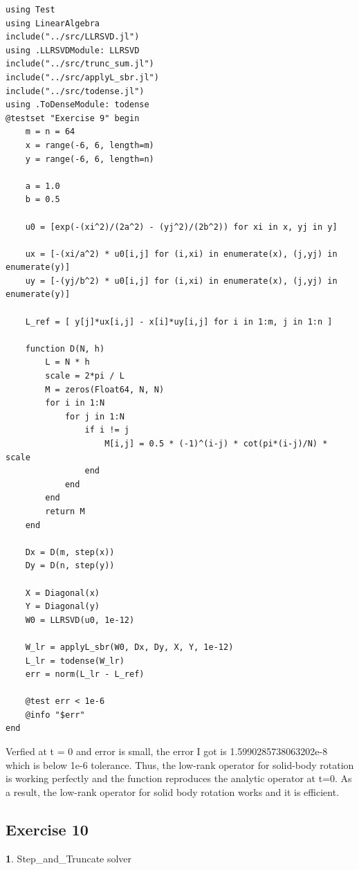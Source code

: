 \documentclass[11pt]{article}
\begin{document}
\begin{lstlisting}
using Test
using LinearAlgebra
include("../src/LLRSVD.jl")
using .LLRSVDModule: LLRSVD
include("../src/trunc_sum.jl")
include("../src/applyL_sbr.jl")
include("../src/todense.jl")
using .ToDenseModule: todense
@testset "Exercise 9" begin
    m = n = 64
    x = range(-6, 6, length=m)
    y = range(-6, 6, length=n)

    a = 1.0
    b = 0.5

    u0 = [exp(-(xi^2)/(2a^2) - (yj^2)/(2b^2)) for xi in x, yj in y]

    ux = [-(xi/a^2) * u0[i,j] for (i,xi) in enumerate(x), (j,yj) in enumerate(y)]
    uy = [-(yj/b^2) * u0[i,j] for (i,xi) in enumerate(x), (j,yj) in enumerate(y)]

    L_ref = [ y[j]*ux[i,j] - x[i]*uy[i,j] for i in 1:m, j in 1:n ]

    function D(N, h)
        L = N * h
        scale = 2*pi / L
        M = zeros(Float64, N, N)
        for i in 1:N
            for j in 1:N
                if i != j
                    M[i,j] = 0.5 * (-1)^(i-j) * cot(pi*(i-j)/N) * scale
                end
            end
        end
        return M
    end

    Dx = D(m, step(x))
    Dy = D(n, step(y))

    X = Diagonal(x)
    Y = Diagonal(y)
    W0 = LLRSVD(u0, 1e-12)

    W_lr = applyL_sbr(W0, Dx, Dy, X, Y, 1e-12)
    L_lr = todense(W_lr)
    err = norm(L_lr - L_ref)

    @test err < 1e-6
    @info "$err"
end
\end{lstlisting}
Verfied at t = 0 and error is small, the error I got is 1.5990285738063202e-8 which is below 1e-6 tolerance. Thus, the low-rank operator for solid-body rotation is working perfectly and the function reproduces the analytic operator at t=0. As a result, the low-rank operator for solid body rotation works and it is efficient.

\subsection*{Exercise 10}
\textbf{1}. Step\_and\_Truncate solver
\end{document}
